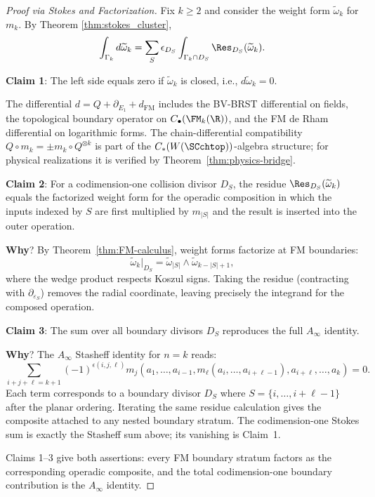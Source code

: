 \begin{proof}[Proof via Stokes and Factorization]
Fix $k \geq 2$ and consider the weight form $\widetilde{\omega}_k$ for $m_k$. By Theorem \ref{thm:stokes_cluster},
\[
\int_{\Gamma_k} d\widetilde{\omega}_k =
\sum_{S}\epsilon_{D_S}
\int_{\Gamma_k \cap D_S}\Res_{D_S}(\widetilde{\omega}_k).
\]

\textbf{Claim 1}: The left side equals zero if $\widetilde{\omega}_k$ is closed, i.e., $d\widetilde{\omega}_k = 0$.

The differential $d = Q + \partial_{E_1} + d_{\mathrm{FM}}$ includes the BV-BRST differential on fields, the topological boundary operator on $C_\bullet(\FM_k(\R))$, and the FM de Rham differential on logarithmic forms. The chain-differential compatibility $Q \circ m_k = \pm m_k \circ Q^{\otimes k}$ is part of the $C_\ast(W(\SCchtop))$-algebra structure; for physical realizations it is verified by Theorem~\ref{thm:physics-bridge}.

\textbf{Claim 2}: For a codimension-one collision divisor $D_S$,
the residue $\Res_{D_S}(\widetilde{\omega}_k)$ equals the factorized
weight form for the operadic composition in which the inputs indexed by
$S$ are first multiplied by $m_{|S|}$ and the result is inserted into
the outer operation.

\textbf{Why}? By Theorem~\ref{thm:FM-calculus}, weight forms factorize at FM boundaries:
\[
\widetilde{\omega}_k|_{D_S}
=
\widetilde{\omega}_{|S|}
\wedge
\widetilde{\omega}_{k-|S|+1},
\]
where the wedge product respects Koszul signs. Taking the residue (contracting with $\partial_{\varepsilon_S}$) removes the radial coordinate, leaving precisely the integrand for the composed operation.

\textbf{Claim 3}: The sum over all boundary divisors $D_S$ reproduces the full $A_\infty$ identity.

\textbf{Why}? The $A_\infty$ Stasheff identity for $n = k$ reads:
\[
\sum_{i+j+\ell = k+1} (-1)^{\epsilon(i,j,\ell)} m_j(a_1, \ldots, a_{i-1}, m_\ell(a_i, \ldots, a_{i+\ell-1}), a_{i+\ell}, \ldots, a_k) = 0.
\]
Each term corresponds to a boundary divisor $D_S$ where
$S = \{i, \ldots, i+\ell-1\}$ after the planar ordering. Iterating
the same residue calculation gives the composite attached to any
nested boundary stratum. The codimension-one Stokes sum is exactly the
Stasheff sum above; its vanishing is Claim~1.

Claims 1--3 give both assertions: every FM boundary stratum factors as
the corresponding operadic composite, and the total codimension-one
boundary contribution is the $A_\infty$ identity.
\end{proof}

